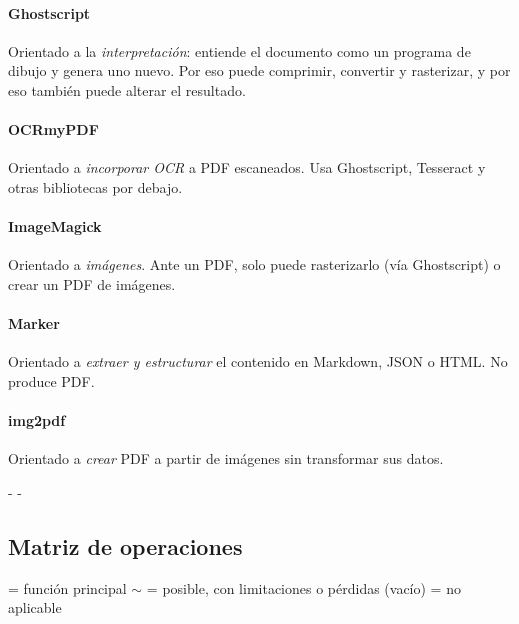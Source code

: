 \documentclass[11pt,a4paper]{article}
\makeatletter
\newcommand{\necesitaespacio}[1]{\par\penalty-100\begingroup
	\setlength{\dimen@}{#1}\dimen@ii\pagegoal\advance\dimen@ii-\pagetotal
	\ifdim\dimen@>\dimen@ii\ifdim\dimen@ii>\z@\vfil\fi\penalty-\@M\fi\endgroup}
\newcommand{\compat}{\textcolor{colconsejo}{\ding{51}}}
\newcommand{\condic}{\textcolor{coladvert}{$\boldsymbol{\sim}$}}
\makeatother
\begin{document}
	\paragraph{Ghostscript} Orientado a la \emph{interpretación}: entiende el documento como un programa de dibujo y genera uno nuevo. Por eso puede comprimir, convertir y rasterizar, y por eso también puede alterar el resultado.
	
	\paragraph{OCRmyPDF} Orientado a \emph{incorporar OCR} a PDF escaneados. Usa Ghostscript, Tesseract y otras bibliotecas por debajo.
	
	\paragraph{ImageMagick} Orientado a \emph{imágenes}. Ante un PDF, solo puede rasterizarlo (vía Ghostscript) o crear un PDF de imágenes.
	
	\paragraph{Marker} Orientado a \emph{extraer y estructurar} el contenido en Markdown, JSON o HTML. No produce PDF.
	
	\paragraph{img2pdf} Orientado a \emph{crear} PDF a partir de imágenes sin transformar sus datos.
	
	\necesitaespacio{14\baselineskip}
	\subsection{Matriz de operaciones}
	
	\compat{} = función principal \quad \condic{} = posible, con limitaciones o pérdidas \quad (vacío) = no aplicable
	
\end{document}

